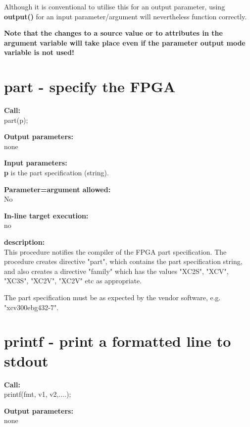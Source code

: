             Although it is conventional to utilise this for an output parameter,
            using {\bf output()} for an input parameter/argument will nevertheless
            function correctly.

            {\bf Note that the changes to a source value or to attributes in the
            argument variable will take place even if the parameter output mode
            variable is not used!}



    \section{part - specify the FPGA}\label{sec:ippart}

        {\bf Call:} \\
        part(p);

        {\bf Output parameters:} \\
        none

        {\bf Input parameters:} \\            
        {\bf p} is the part specification (string).
        
        {\bf Parameter=argument allowed:} \\
        No

        {\bf In-line target execution:} \\
        no

        {\bf description:} \\
        This procedure notifies the compiler of the FPGA part specification.
        The procedure creates directive "part", which contains the
        part specification string, and also creates a directive "family"
        which has the values "XC2S", "XCV", "XC3S", "XC2V", "XC2V" etc as
        appropriate.

        The part specification must be as expected by the vendor software,
        e.g. "xcv300ebg432-7".




    \section{printf - print a formatted line to stdout}\label{sec:ipprintf}

        {\bf Call:} \\
        printf(fmt, v1, v2,....);
        
        {\bf Output parameters:} \\
        none
        
